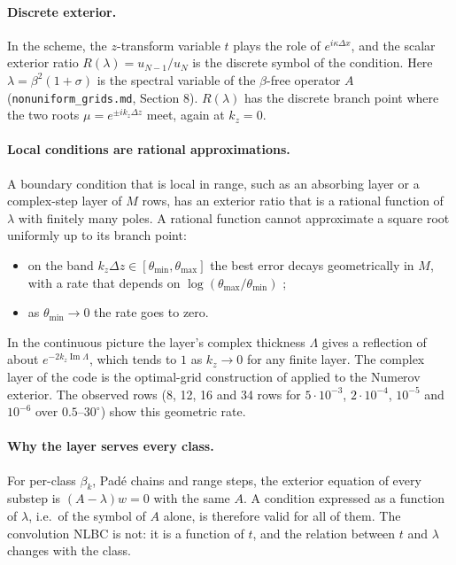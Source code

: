 \documentclass[11pt]{article}
\begin{document}
\paragraph{Discrete exterior.} In the scheme, the $z$-transform variable $t$
plays the role of $e^{i\kappa\Delta x}$, and the scalar exterior ratio
$R(\lambda)=u_{N-1}/u_N$ is the discrete symbol of the condition. Here
$\lambda=\beta^2(1+\sigma)$ is the spectral variable of the $\beta$-free
operator $A$ (\texttt{nonuniform\_grids.md}, Section 8). $R(\lambda)$ has the
discrete branch point where the two roots
$\mu=e^{\pm ik_z\Delta z}$ meet, again at $k_z=0$.

\paragraph{Local conditions are rational approximations.} A boundary condition
that is local in range, such as an absorbing layer or a complex-step layer of
$M$ rows, has an exterior ratio that is a rational function of $\lambda$ with
finitely many poles. A rational function cannot approximate a square root
uniformly up to its branch point:
\begin{itemize}
\item on the band $k_z\Delta z\in[\theta_{\min},\theta_{\max}]$ the best error
  decays geometrically in $M$, with a rate that depends on
  $\log(\theta_{\max}/\theta_{\min})$ \cite{newman,idk};
\item as $\theta_{\min}\to0$ the rate goes to zero.
\end{itemize}
In the continuous picture the layer's complex thickness $\Lambda$ gives a
reflection of about $e^{-2k_z\operatorname{Im}\Lambda}$, which tends to $1$ as
$k_z\to0$ for any finite layer. The complex layer of the code is the optimal-grid
construction of \cite{idk,adgk} applied to the Numerov exterior. The observed
rows (8, 12, 16 and 34 rows for $5\cdot10^{-3}$, $2\cdot10^{-4}$,
$10^{-5}$ and $10^{-6}$ over $0.5$--$30^\circ$) show this geometric rate.

\paragraph{Why the layer serves every class.} For per-class $\beta_k$, Padé
chains and range steps, the exterior equation of every substep is
$(A-\lambda)w=0$ with the same $A$. A condition expressed as a function of
$\lambda$, i.e.\ of the symbol of $A$ alone, is therefore valid for all of
them. The convolution NLBC is not: it is a function of $t$, and the relation
between $t$ and $\lambda$ changes with the class.
\end{document}
